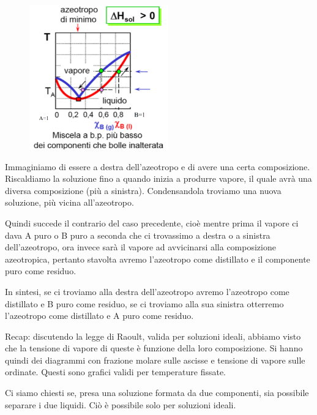 \vspace{-0.2cm}\begin{minipage}{0.4\textwidth}
    \begin{figure}[H]
        \includegraphics[width=6cm]{immagini/distillazione_endotermica.png}
    \end{figure}
\end{minipage}
\begin{minipage}{0.6\textwidth}
    \vspace{0.6cm}Immaginiamo di essere a destra dell'azeotropo e di avere una certa composizione. Riscaldiamo la soluzione fino a quando inizia a produrre vapore, il quale avrà una diversa composizione (più a sinistra). Condensandola troviamo una nuova soluzione, più vicina all'azeotropo.

    Quindi succede il contrario del caso precedente, cioè mentre prima il vapore ci dava A puro o B puro a seconda che ci trovassimo a destra o a sinistra dell'azeotropo, ora invece sarà il vapore ad avvicinarsi alla composizione azeotropica, pertanto stavolta avremo l'azeotropo come distillato e il componente puro come residuo.
\end{minipage}

\vspace{0.2cm}In sintesi, se ci troviamo alla destra dell'azeotropo avremo l'azeotropo come distillato e B puro come residuo, se ci troviamo alla sua sinistra otterremo l'azeotropo come distillato e A puro come residuo.

\vspace{0.2cm}Recap: discutendo la legge di Raoult, valida per soluzioni ideali, abbiamo visto che la tensione di vapore di queste è funzione della loro composizione. Si hanno quindi dei diagrammi con frazione molare sulle ascisse e tensione di vapore sulle ordinate. Questi sono grafici validi per temperature fissate.

Ci siamo chiesti se, presa una soluzione formata da due componenti, sia possibile separare i due liquidi. Ciò è possibile solo per soluzioni ideali.

